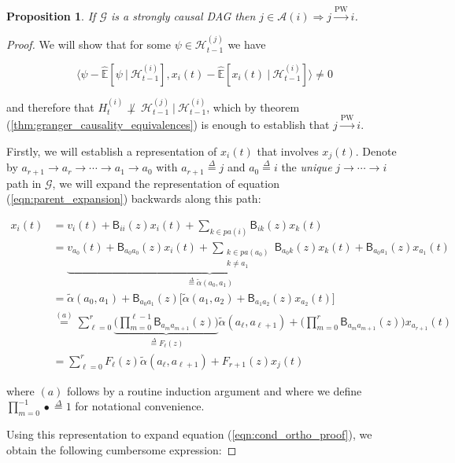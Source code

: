 \documentclass{statsoc}
\def\pwgc{\overset{\text{PW}}{\rightarrow}}  %
\def\gcg{\mathcal{G}}  %
\def\B{\mathsf{B}}  %
\def\H{\mathcal{H}}  %
\newcommand{\linE}[2]{\hat{\E}[#1\ |\ #2]}  %
\newcommand{\pa}[1]{pa(#1)}  %
\newcommand{\anc}[1]{\mathcal{A}(#1)}  %
\newcommand{\wtalpha}[2]{\widetilde{\alpha}(#1, #2)}  %
\newcommand{\gcgpath}[2]{#1 \rightarrow \cdots \rightarrow #2}  %
\newtheorem{proposition}{Proposition}
\def\defeq{\overset{\Delta}{=}}  %
\def\H{\mathcal{H}}  %
\def\E{\mathbb{E}}  %
\newcommand{\inner}[2]{\langle #1, #2 \rangle}  %
\begin{document}
\begin{proposition}
  \label{prop:pwgc_anc}
  If $\gcg$ is a strongly causal DAG then $j \in \anc{i} \Rightarrow j \pwgc i$.
\end{proposition}
\begin{proof}
  We will show that for some $\psi \in \H_{t - 1}^{(j)}$ we have

  \begin{equation}
    \label{eqn:cond_ortho_proof}
    \inner{\psi - \linE{\psi}{\H_{t - 1}^{(i)}}}{x_i(t) - \linE{x_i(t)}{\H_{t - 1}^{(i)}}} \ne 0
  \end{equation}

  and therefore that $H_t^{(i)} \not\perp\ \H_{t - 1}^{(j)}\ |\ \H_{t - 1}^{(i)}$, which by theorem (\ref{thm:granger_causality_equivalences}) is enough to establish that $j \pwgc i$.

  Firstly, we will establish a representation of $x_i(t)$ that involves $x_j(t)$.  Denote by $a_{r + 1} \rightarrow a_r \rightarrow \cdots \rightarrow a_1 \rightarrow a_0$ with $a_{r + 1} \defeq j$ and $a_0 \defeq i$ the \textit{unique} $\gcgpath{j}{i}$ path in $\gcg$, we will expand the representation of equation (\ref{eqn:parent_expansion}) backwards along this path:

  \begin{align*}
    x_i(t) &= v_i(t) + \B_{ii}(z) x_i(t) + \sum_{k \in \pa{i}}\B_{ik}(z) x_k(t)\\
           &= \underbrace{v_{a_0}(t) + \B_{a_0a_0}(z) x_i(t) + \sum_{\substack{k \in \pa{a_0} \\ k \ne a_1}}\B_{a_0 k}(z) x_k(t)}_{\defeq \wtalpha{a_0}{a_1}} + \B_{a_0a_1}(z)x_{a_1}(t)\\
           &= \wtalpha{a_0}{a_1} + \B_{a_0a_1}(z)\big[\wtalpha{a_1}{a_2} + \B_{a_1a_2}(z)x_{a_2}(t) \big]\\
           &\overset{(a)}{=} \sum_{\ell = 0}^r \underbrace{\Big(\prod_{m = 0}^{\ell - 1} \B_{a_m a_{m + 1}}(z) \Big)}_{\defeq F_\ell(z)} \wtalpha{a_\ell}{a_{\ell + 1}} + \Big(\prod_{m = 0}^{r}\B_{a_m a_{m + 1}}(z)\Big)x_{a_{r + 1}}(t)\\
           &= \sum_{\ell = 0}^r F_\ell(z) \wtalpha{a_\ell}{a_{\ell + 1}} + F_{r + 1}(z) x_j(t)
  \end{align*}

  where $(a)$ follows by a routine induction argument and where we define $\prod_{m = 0}^{-1} \bullet \defeq 1$ for notational convenience.

  Using this representation to expand equation (\ref{eqn:cond_ortho_proof}), we obtain the following cumbersome expression:


\end{proof}
\end{document}
